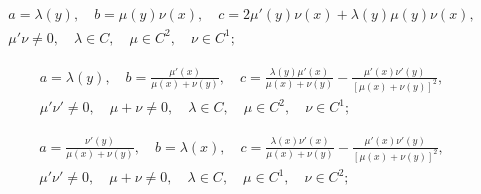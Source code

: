 \begin{equation}\label{17}


\begin{array}{c}


a=\lambda(y),\quad b=\mu(y)\nu(x),\quad


c=2\mu'(y)\nu(x)+\lambda(y)\mu(y)\nu(x),\\[2mm]


\mu'\nu\ne0,\quad \lambda\in C,\quad \mu\in C^2,


\quad \nu\in C^1;


\end{array}


\end{equation}


\begin{equation}\label{18}


\begin{array}{c}


a=\lambda(y),\quad b=\frac{\mu'(x)}{\mu(x)+\nu(y)},\quad


c=\frac{\lambda(y)\mu'(x)}{\mu(x)+\nu(y)}


-\frac{\mu'(x)\nu'(y)}{[\mu(x)+\nu(y)]^2},\\[3mm]


\mu'\nu'\ne0,\quad \mu+\nu\ne0,\quad \lambda\in C,\quad \mu\in C^2,


\quad \nu\in C^1;


\end{array}


\end{equation}


\begin{equation}\label{19}


\begin{array}{c}


a=\frac{\nu'(y)}{\mu(x)+\nu(y)},\quad b=\lambda(x),\quad


c=\frac{\lambda(x)\nu'(x)}{\mu(x)+\nu(y)}


-\frac{\mu'(x)\nu'(y)}{[\mu(x)+\nu(y)]^2},\\[3mm]


\mu'\nu'\ne0,\quad \mu+\nu\ne0,\quad \lambda\in C,\quad \mu\in C^1,


\quad \nu\in C^2;


\end{array}


\end{equation}


